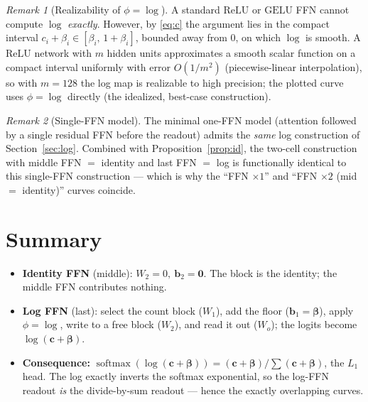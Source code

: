 \documentclass[11pt]{article}
\theoremstyle{remark}
\newtheorem{remark}{Remark}
\newcommand{\sm}{\operatorname{softmax}}
\newcommand{\ve}[1]{\bm{#1}}
\begin{document}
\begin{remark}[Realizability of $\phi=\log$]
A standard $\mathrm{ReLU}$ or $\mathrm{GELU}$ FFN cannot compute $\log$ \emph{exactly}.
However, by \eqref{eq:c} the argument lies in the compact interval
$c_i+\beta_i\in[\beta_i,\,1+\beta_i]$, bounded away from $0$, on which $\log$ is smooth.
A $\mathrm{ReLU}$ network with $m$ hidden units approximates a smooth scalar function on
a compact interval uniformly with error $O(1/m^2)$ (piecewise-linear interpolation), so
with $m=128$ the log map is realizable to high precision; the plotted curve uses
$\phi=\log$ directly (the idealized, best-case construction).
\end{remark}

\begin{remark}[Single-FFN model]
The minimal one-FFN model (attention followed by a single residual FFN before the
readout) admits the \emph{same} log construction of Section~\ref{sec:log}. Combined with
Proposition~\ref{prop:id}, the two-cell construction with middle FFN $=$ identity and last
FFN $=$ log is functionally identical to this single-FFN construction --- which is why
the ``FFN $\times 1$'' and ``FFN $\times 2$ (mid $=$ identity)'' curves coincide.
\end{remark}

\section{Summary}

\begin{itemize}
\item \textbf{Identity FFN} (middle): $W_2=0,\ \ve b_2=\ve0$. The block is the identity;
the middle FFN contributes nothing.
\item \textbf{Log FFN} (last): select the count block ($W_1$), add the floor
($\ve b_1=\ve\beta$), apply $\phi=\log$, write to a free block ($W_2$), and read it out
($W_o$); the logits become $\log(\ve c+\ve\beta)$.
\item \textbf{Consequence:} $\sm(\log(\ve c+\ve\beta))=(\ve c+\ve\beta)/\!\sum(\ve c+\ve\beta)$,
the $L_1$ head. The log exactly inverts the softmax exponential, so the log-FFN readout
\emph{is} the divide-by-sum readout --- hence the exactly overlapping curves.
\end{itemize}
\end{document}
